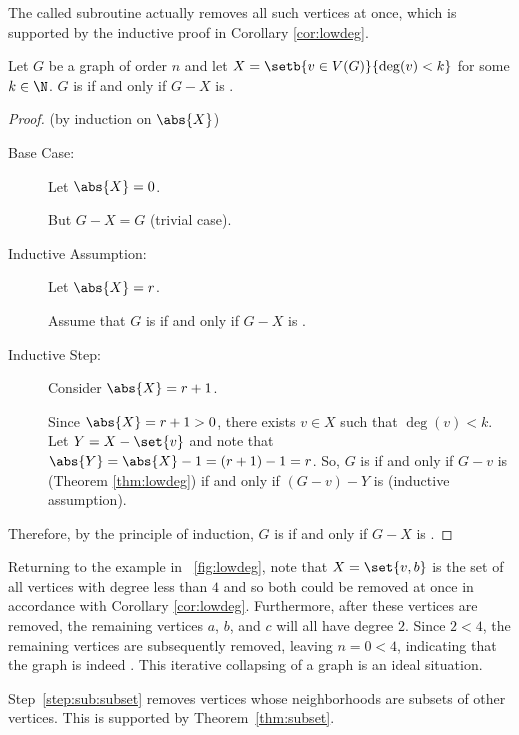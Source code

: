 The called subroutine actually removes all such vertices at once, which is supported by the inductive proof in
Corollary \ref{cor:lowdeg}.

\begin{corollary}
  \label{cor:lowdeg}
  Let \(G\) be a graph of order \(n\) and let \(X=\setb{v\in V(G)}{\deg(v)<k}\) for some \(k\in\N\).  \(G\) is
   if and only if \(G-X\) is .
\end{corollary}

\begin{proof}
  (by induction on \(\abs{X}\))
  \begin{description}
  \item[Base Case:] Let \(\abs{X}=0\).

    But \(G-X=G\) (trivial case).

  \item[Inductive Assumption:] Let \(\abs{X}=r\).

    Assume that \(G\) is  if and only if \(G-X\) is .

  \item[Inductive Step:] Consider \(\abs{X}=r+1\).
    
    Since \(\abs{X}=r+1>0\), there exists \(v\in X\) such that \(\deg(v)<k\).  Let \(Y=X-\set{v}\) and note that
    \(\abs{Y}=\abs{X}-1=(r+1)-1=r\).  So, \(G\) is  if and only if \(G-v\) is  (Theorem
    \ref{thm:lowdeg}) if and only if \((G-v)-Y\) is  (inductive assumption).
  \end{description}

  Therefore, by the principle of induction, \(G\) is  if and only if \(G-X\) is .
\end{proof}

Returning to the example in \figurename~\ref{fig:lowdeg}, note that \(X=\set{v,b}\) is the set of all vertices with
degree less than \(4\) and so both could be removed at once in accordance with Corollary \ref{cor:lowdeg}.
Furthermore, after these vertices are removed, the remaining vertices \(a\), \(b\), and \(c\) will all have degree
\(2\).  Since \(2<4\), the remaining vertices are subsequently removed, leaving \(n=0<4\), indicating that the
graph is indeed .  This iterative collapsing of a graph is an ideal situation.

Step~\ref{step:sub:subset} removes vertices whose neighborhoods are subsets of other vertices.  This is supported
by Theorem~\ref{thm:subset}.

